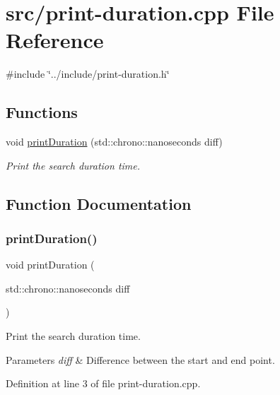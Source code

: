 \hypertarget{print-duration_8cpp}{}\section{src/print-\/duration.cpp File Reference}
\label{print-duration_8cpp}
{\ttfamily \#include \char`\"{}../include/print-\/duration.\+h\char`\"{}}\newline
\subsection*{Functions}
\begin{DoxyCompactItemize}
\item 
void \mbox{\hyperlink{print-duration_8cpp_a4c1e331c0cba77ad1ab6588631c69dd4}{print\+Duration}} (std\+::chrono\+::nanoseconds diff)
\begin{DoxyCompactList}\small\item\em Print the search duration time. \end{DoxyCompactList}\end{DoxyCompactItemize}


\subsection{Function Documentation}
\mbox{\label{print-duration_8cpp_a4c1e331c0cba77ad1ab6588631c69dd4}} 
\subsubsection{\texorpdfstring{printDuration()}{printDuration()}}
{\footnotesize\ttfamily void print\+Duration (\begin{DoxyParamCaption}\item[{std\+::chrono\+::nanoseconds}]{diff }\end{DoxyParamCaption})}



Print the search duration time. 


\begin{DoxyParams}{Parameters}
{\em diff} & Difference between the start and end point. \\
\hline
\end{DoxyParams}


Definition at line 3 of file print-\/duration.\+cpp.

